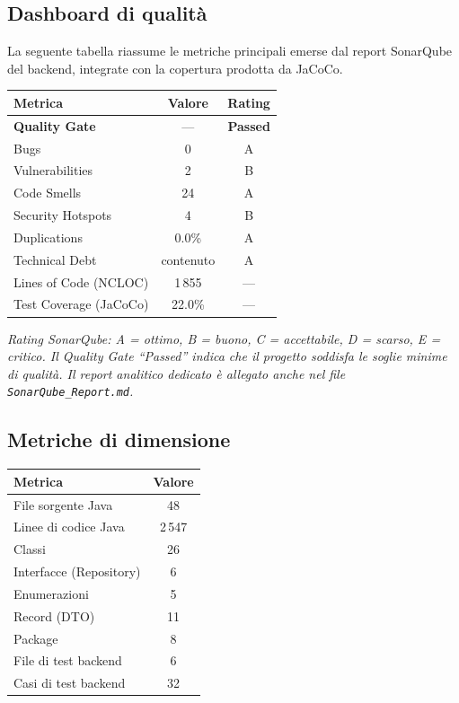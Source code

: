 ﻿\documentclass[a4paper,11pt]{article}
\begin{document}
\subsection{Dashboard di qualit\`a}

La seguente tabella riassume le metriche principali emerse dal report SonarQube del backend, integrate con la copertura prodotta da JaCoCo.

\begin{tabular}{|l|c|c|}
\hline
\textbf{Metrica} & \textbf{Valore} & \textbf{Rating} \\
\hline
\textbf{Quality Gate} & --- & \textbf{Passed} \\
\hline
Bugs & 0 & A \\
\hline
Vulnerabilities & 2 & B \\
\hline
Code Smells & 24 & A \\
\hline
Security Hotspots & 4 & B \\
\hline
Duplications & 0.0\% & A \\
\hline
Technical Debt & contenuto & A \\
\hline
Lines of Code (NCLOC) & 1\,855 & --- \\
\hline
Test Coverage (JaCoCo) & 22.0\% & --- \\
\hline
\end{tabular}

\vspace{0.3cm}

\emph{Rating SonarQube: A = ottimo, B = buono, C = accettabile, D = scarso, E = critico. Il Quality Gate ``Passed'' indica che il progetto soddisfa le soglie minime di qualit\`a. Il report analitico dedicato \`e allegato anche nel file \texttt{SonarQube\_Report.md}.}

\subsection{Metriche di dimensione}

\begin{tabular}{|l|c|}
\hline
\textbf{Metrica} & \textbf{Valore} \\
\hline
File sorgente Java & 48 \\
\hline
Linee di codice Java & 2\,547 \\
\hline
Classi & 26 \\
\hline
Interfacce (Repository) & 6 \\
\hline
Enumerazioni & 5 \\
\hline
Record (DTO) & 11 \\
\hline
Package & 8 \\
\hline
File di test backend & 6 \\
\hline
Casi di test backend & 32 \\
\hline
\end{tabular}
\end{document}
